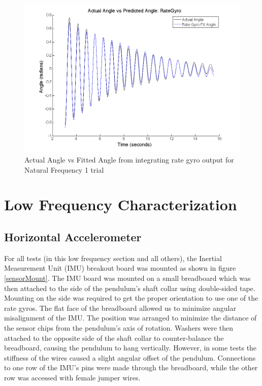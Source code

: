 \documentclass{article}
\theoremstyle{plain}
\theoremstyle{definition}
\theoremstyle{remark}
\begin{document}
\begin{figure}
\begin{center}
\includegraphics[width = 13cm]{rateGyroCalibResultsS8_636380.png}
\caption{Actual Angle vs Fitted Angle from integrating rate gyro output for Natural Frequency 1 trial}
\label{gyroCalib}
\end{center}
\end{figure}

\clearpage
\section{Low Frequency Characterization}

\subsection{Horizontal Accelerometer}

For all tests (in this low frequency section and all others), the Inertial Measurement Unit (IMU) breakout board was mounted as shown in figure \ref{sensorMount}. The IMU board was mounted on a small breadboard which was then attached to the side of the pendulum's shaft collar using double-sided tape. Mounting on the side was required to get the proper orientation to use one of the rate gyros. The flat face of the breadboard allowed us to minimize angular misalignment of the IMU. The position was arranged to minimize the distance of the sensor chips from the pendulum's axis of rotation. Washers were then attached to the opposite side of the shaft collar to counter-balance the breadboard, causing the pendulum to hang vertically. However, in some tests the stiffness of the wires caused a slight angular offset of the pendulum. Connections to one row of the IMU's pins were made through the breadboard, while the other row was accessed with female jumper wires.\\ 
\end{document}
